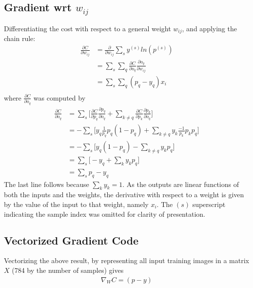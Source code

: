 \documentclass{article}
\begin{document}
   \subsection{Gradient wrt $w_{ij}$}
   Differentiating the cost with respect to a general weight $w_{ij}$, and applying
   the chain rule:
      \begin{equation*} \begin{split}
        \frac{ \partial C}{ \partial w_{ij} }
           &= \frac{ \partial }{ \partial w_{ij} } \sum_{s} y^{(s)} ln(p^{(s)}) \\
           &= \sum_s \sum_q  \frac{ \partial C}{ \partial o_q } \frac{ \partial o_q }{ \partial w_{ij} } \\
           &= \sum_s \sum_q ( p_q - y_q ) x_i \\
      \end{split} \end{equation*}
   where $ \frac{ \partial C}{ \partial o_q } $ was computed by
      \begin{equation*} \begin{split}
        \frac{ \partial C}{ \partial o_q }
           &= \sum_s \bigg[   \frac{ \partial C}{ \partial p_q } \frac{ \partial p_q}{ \partial o_q }    +   \sum_{k \neq q} \frac{ \partial C}{ \partial p_k } \frac{ \partial p_k}{ \partial o_q }  \bigg]  \\
           &= - \sum_s \bigg[    y_q \frac{1}{p_q} p_q (1 - p_q)  +   \sum_{k \neq q} y_k \frac{-1}{p_k} p_k p_q  \bigg]  \\
           &= - \sum_s \bigg[    y_q (1 - p_q)  -  \sum_{k \neq q} y_k p_q       \bigg]   \\
           &= \sum_s   \bigg[    - y_q  +  \sum_k y_k p_q   \bigg]  \\
           &= \sum_s p_q - y_q
      \end{split} \end{equation*}
   The last line follows because $\sum_k y_k = 1$.
   As the outputs are linear functions of both the inputs and the weights, the derivative
   with respect to a weight is given by the value of the input to that weight, namely $x_i$.
   The $(s)$ superscript indicating the sample index was omitted for clarity of presentation.

   \subsection{Vectorized Gradient Code}
   Vectorizing the above result, by representing all input training images in a matrix $X$
   (784 by the number of samples) gives
      \begin{equation*} \begin{split}
        \nabla_W C =  ( p - y )
      \end{split} \end{equation*}
\end{document}
